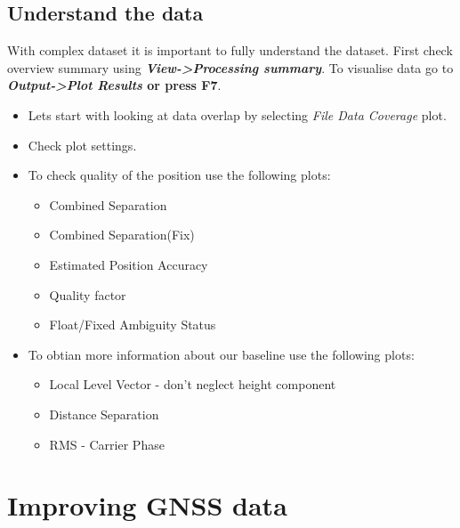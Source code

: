 \documentclass[11pt,fleqn]{book} %
\begin{document}
\subsection{Understand the data}

With complex dataset it is important to fully understand the dataset. First check overview summary using \textbf{\emph{View->Processing summary}}. To visualise data go to \textbf{\emph{Output->Plot Results} or press \textbf{F7}}.

\begin{itemize}
	\item Lets start with looking at data overlap by selecting\emph{ File Data Coverage} plot. 
	\item Check plot settings.
	\item To check quality of the position use the following plots:
	\begin{itemize}
		\item Combined Separation
		\item Combined Separation(Fix)
		\item Estimated Position Accuracy
		\item Quality factor
		\item Float/Fixed Ambiguity Status
\end{itemize}
	\item To obtian more information about our baseline use the following plots:
	\begin{itemize}
		\item Local Level Vector - don't neglect height component
		\item Distance Separation
		\item RMS - Carrier Phase
	\end{itemize}
\end{itemize}




\section{Improving GNSS data}
\end{document}
